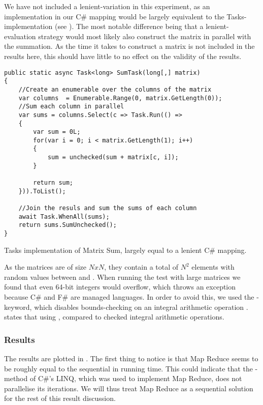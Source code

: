 We have not included a lenient-variation in this experiment, as an implementation in our C\# mapping would be largely equivalent to the Tasks-implementation (see ). The most notable difference being that a lenient-evaluation strategy would most likely also construct the matrix in parallel with the summation. As the time it takes to construct a matrix is not included in the results here, this should have little to no effect on the validity of the results.
\begin{listing}
\begin{verbatim}
public static async Task<long> SumTask(long[,] matrix)
{
    //Create an enumerable over the columns of the matrix
    var columns  = Enumerable.Range(0, matrix.GetLength(0));
    //Sum each column in parallel
    var sums = columns.Select(c => Task.Run(() =>
    {
        var sum = 0L;
        for(var i = 0; i < matrix.GetLength(1); i++)
        {
            sum = unchecked(sum + matrix[c, i]);
        }

        return sum;
    })).ToList();

    //Join the resuls and sum the sums of each column
    await Task.WhenAll(sums);
    return sums.SumUnchecked();
}
\end{verbatim}
\caption{Tasks implementation of Matrix Sum, largely equal to a lenient C\# mapping.} \label{lst:matrix-sum-csharp}
\end{listing}

As the matrices are of size $N x N$, they contain a total of $N^2$ elements with random values between  and . When running the test with large matrices we found that even 64-bit integers would overflow, which throws an exception because C\# and F\# are managed languages. In order to avoid this, we used the -keyword, which disables bounds-checking on an integral arithmetic operation \cite{csharp:unchecked}. \cite{csharp:unchecked} states that using  \textit{}, compared to checked integral arithmetic operations.

\subsubsection{Results}
The results are plotted in . The first thing to notice is that Map Reduce seems to be roughly equal to the sequential in running time. This could indicate that the -method of C\#'s \gls{LINQ}, which was used to implement Map Reduce, does not parallelise its iterations. We will thus treat Map Reduce as a sequential solution for the rest of this result discussion.

